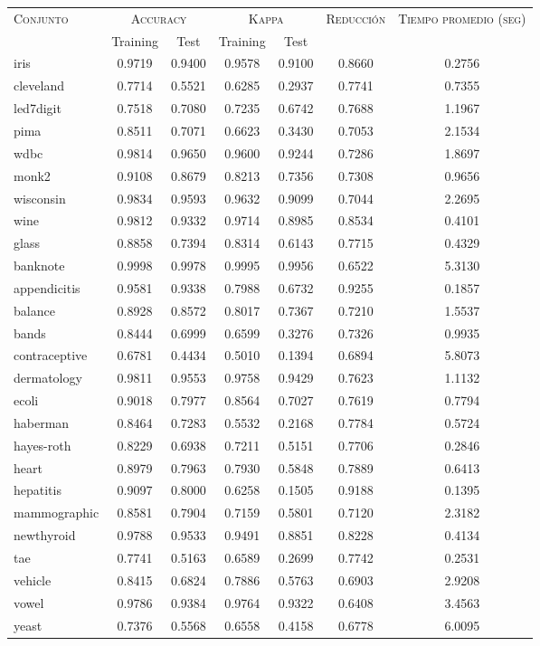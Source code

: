 \begin{table}[]
\centering
\begin{tabular}{l c c c c c c}
\hline
\multirow{2}{*}{\textsc{Conjunto}}
	& \multicolumn{2}{c}{\textsc{Accuracy}}
	& \multicolumn{2}{c}{\textsc{Kappa}}
	& \textsc{Reducción}
	& \textsc{Tiempo promedio (seg)} \\
	& Training & Test
	& Training & Test \\ 
\hline
\hline

iris & 0.9719 & 0.9400 & 0.9578 & 0.9100 & 0.8660 & 0.2756 \\
cleveland & 0.7714 & 0.5521 & 0.6285 & 0.2937 & 0.7741 & 0.7355 \\
led7digit & 0.7518 & 0.7080 & 0.7235 & 0.6742 & 0.7688 & 1.1967 \\
pima & 0.8511 & 0.7071 & 0.6623 & 0.3430 & 0.7053 & 2.1534 \\
wdbc & 0.9814 & 0.9650 & 0.9600 & 0.9244 & 0.7286 & 1.8697 \\
monk2 & 0.9108 & 0.8679 & 0.8213 & 0.7356 & 0.7308 & 0.9656 \\
wisconsin & 0.9834 & 0.9593 & 0.9632 & 0.9099 & 0.7044 & 2.2695 \\
wine & 0.9812 & 0.9332 & 0.9714 & 0.8985 & 0.8534 & 0.4101 \\
glass & 0.8858 & 0.7394 & 0.8314 & 0.6143 & 0.7715 & 0.4329 \\
banknote & 0.9998 & 0.9978 & 0.9995 & 0.9956 & 0.6522 & 5.3130 \\
appendicitis & 0.9581 & 0.9338 & 0.7988 & 0.6732 & 0.9255 & 0.1857 \\
balance & 0.8928 & 0.8572 & 0.8017 & 0.7367 & 0.7210 & 1.5537 \\
bands & 0.8444 & 0.6999 & 0.6599 & 0.3276 & 0.7326 & 0.9935 \\
contraceptive & 0.6781 & 0.4434 & 0.5010 & 0.1394 & 0.6894 & 5.8073 \\
dermatology & 0.9811 & 0.9553 & 0.9758 & 0.9429 & 0.7623 & 1.1132 \\
ecoli & 0.9018 & 0.7977 & 0.8564 & 0.7027 & 0.7619 & 0.7794 \\
haberman & 0.8464 & 0.7283 & 0.5532 & 0.2168 & 0.7784 & 0.5724 \\
hayes-roth & 0.8229 & 0.6938 & 0.7211 & 0.5151 & 0.7706 & 0.2846 \\
heart & 0.8979 & 0.7963 & 0.7930 & 0.5848 & 0.7889 & 0.6413 \\
hepatitis & 0.9097 & 0.8000 & 0.6258 & 0.1505 & 0.9188 & 0.1395 \\
mammographic & 0.8581 & 0.7904 & 0.7159 & 0.5801 & 0.7120 & 2.3182 \\
newthyroid & 0.9788 & 0.9533 & 0.9491 & 0.8851 & 0.8228 & 0.4134 \\
tae & 0.7741 & 0.5163 & 0.6589 & 0.2699 & 0.7742 & 0.2531 \\
vehicle & 0.8415 & 0.6824 & 0.7886 & 0.5763 & 0.6903 & 2.9208 \\
vowel & 0.9786 & 0.9384 & 0.9764 & 0.9322 & 0.6408 & 3.4563 \\
yeast & 0.7376 & 0.5568 & 0.6558 & 0.4158 & 0.6778 & 6.0095 \\


\end{tabular}
\end{table}
